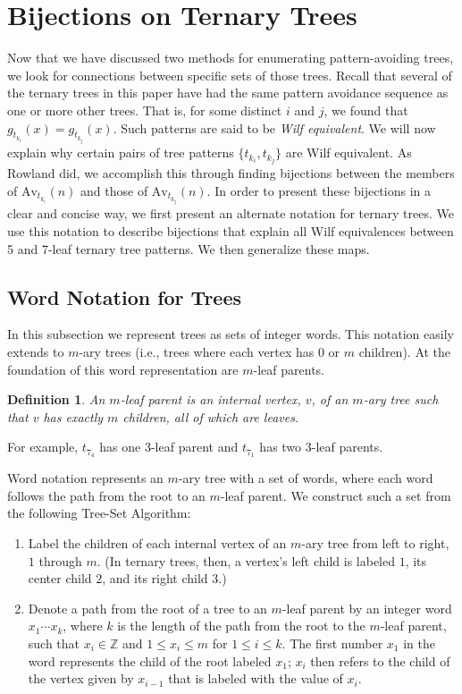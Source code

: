 \documentclass[12pt]{article}
\newtheorem{definition}{Definition}
\begin{document}
\section{Bijections on Ternary Trees}\label{S:bijections}
Now that we have discussed two methods for enumerating pattern-avoiding trees, we look for connections between specific sets of those trees.  Recall that several of the ternary trees in this paper have had the same pattern avoidance sequence as one or more other trees.  That is, for some distinct $i$ and $j$, we found that $g_{t_{k_i}}(x) = g_{t_{k_j}}(x)$.  Such patterns are said to be \emph{Wilf equivalent}.  We will now explain why certain pairs of tree patterns $\{t_{k_i},t_{k_j}\}$ are Wilf equivalent. As Rowland did, we accomplish this through finding bijections between the members of $\text{Av}_{t_{k_i}}(n)$ and those of $\text{Av}_{t_{k_j}}(n)$.  In order to present these bijections in a clear and concise way, we first present an alternate notation for ternary trees.  We use this notation to describe bijections that explain all Wilf equivalences between 5 and 7-leaf ternary tree patterns.  We then generalize these maps.

\subsection{Word Notation for Trees}
In this subsection we represent trees as sets of integer words.  This notation easily extends to $m$-ary trees (i.e., trees where each vertex has 0 or $m$ children). At the foundation of this word representation are $m$-leaf parents.

\begin{definition} An \emph{$m$-leaf parent} is an internal vertex, $v$, of an $m$-ary tree such that $v$ has exactly $m$ children, all of which are leaves. \end{definition}

For example, $t_{7_4}$ has one 3-leaf parent and $t_{7_1}$ has two 3-leaf parents.  

Word notation represents an $m$-ary tree with a set of words, where each word follows the path from the root to an $m$-leaf parent.  We construct such a set from the following Tree-Set Algorithm:

\begin{enumerate}
\item Label the children of each internal vertex of an $m$-ary tree from left to right, $1$ through $m$.  (In ternary trees, then, a vertex's left child is labeled $1$, its center child $2$, and its right child $3$.)
\item Denote a path from the root of a tree to an $m$-leaf parent by an integer word $x_1 \cdots x_k$, where $k$ is the length of the path from the root to the $m$-leaf parent, such that $x_i \in \mathbb{Z}$ and $1\leq x_i \leq m$ for $1 \leq i \leq k$. The first number $x_1$ in the word represents the child of the root labeled $x_1$; $x_i$ then refers to the child of the vertex given by $x_{i-1}$ that is labeled with the value of $x_i$. 
\end{enumerate}
\end{document}
